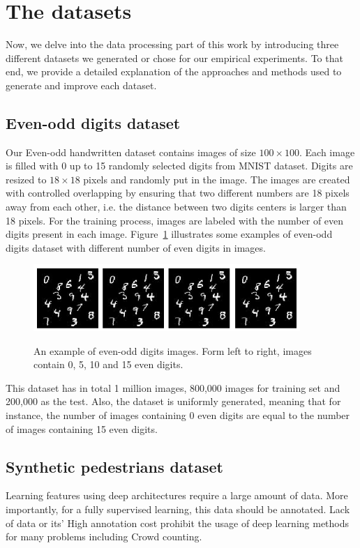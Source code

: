 \section{The datasets}
\label{dataha}
Now, we delve into the data processing part of this work by introducing three different datasets we generated or chose for our empirical experiments. To that end, we provide a detailed explanation of the approaches and methods used to generate and improve each dataset.

\subsection{Even-odd digits dataset}
\label{subsubsec:digit}

Our Even-odd handwritten dataset contains images of size $100\times100$. Each image is filled with 0 up to 15 randomly selected digits from MNIST dataset. Digits are resized to $18\times18$ pixels and randomly put in the image. The images are created with controlled overlapping by ensuring that two different numbers are 18 pixels away from each other, i.e. the distance between two digits centers is larger than 18 pixels. For the training process, images are labeled with the number of even digits present in each image. Figure~\ref{fig:l2cmnist} illustrates some examples of even-odd digits dataset with different number of even digits in images. 

\begin{figure}[H]
	\centering
	{\includegraphics[width=0.9\textwidth]{images/l2cmnist}}
		\caption{An example of even-odd digits images. Form left to right, images contain 0, 5, 10 and 15 even digits.}
	\label{fig:l2cmnist}
\end{figure}

\indent This dataset has in total 1 million images, 800,000 images for training set and 200,000 as the test. Also, the dataset is uniformly generated, meaning that for instance, the number of images containing 0 even digits are equal to the number of images containing 15 even digits.  

\subsection{Synthetic pedestrians dataset}
\label{subsec:synped}
Learning features using deep architectures require a large amount of data. More importantly, for a fully supervised learning, this data should be annotated. Lack of data or its' High annotation cost prohibit the usage of deep learning methods for many problems including Crowd counting. 

